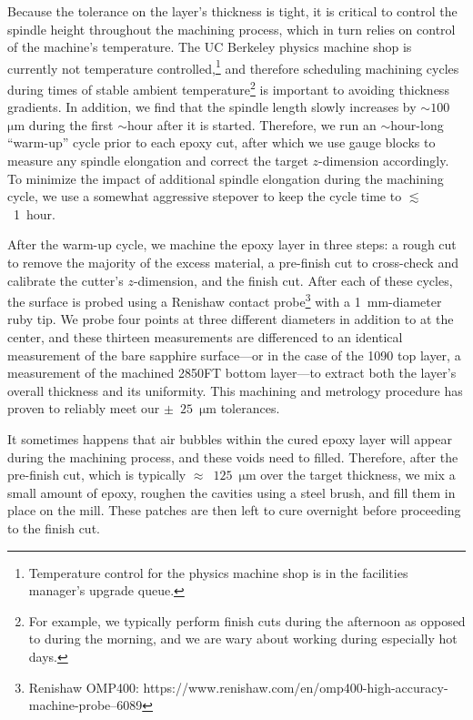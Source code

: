 Because the tolerance on the layer's thickness is tight, it is critical to control the spindle height throughout the machining process, which in turn relies on control of the machine's temperature. The UC Berkeley physics machine shop is currently not temperature controlled,\footnote{Temperature control for the physics machine shop is in the facilities manager's upgrade queue.} and therefore scheduling machining cycles during times of stable ambient temperature\footnote{For example, we typically perform finish cuts during the afternoon as opposed to during the morning, and we are wary about working during especially hot days.} is important to avoiding thickness gradients. In addition, we find that the spindle length slowly increases by $\sim 100$~$\mathrm{\mu m}$ during the first $\sim$hour after it is started. Therefore, we run an $\sim$hour-long ``warm-up'' cycle prior to each epoxy cut, after which we use gauge blocks to measure any spindle elongation and correct the target $z$-dimension accordingly. To minimize the impact of additional spindle elongation during the machining cycle, we use a somewhat aggressive stepover to keep the cycle time to $\lesssim$~1~hour.

After the warm-up cycle, we machine the epoxy layer in three steps: a rough cut to remove the majority of the excess material, a pre-finish cut to cross-check and calibrate the cutter's $z$-dimension, and the finish cut. After each of these cycles, the surface is probed using a Renishaw contact probe\footnote{Renishaw OMP400: https://www.renishaw.com/en/omp400-high-accuracy-machine-probe--6089} with a 1~mm-diameter ruby tip. We probe four points at three different diameters in addition to at the center, and these thirteen measurements are differenced to an identical measurement of the bare sapphire surface---or in the case of the 1090 top layer, a measurement of the machined 2850FT bottom layer---to extract both the layer's overall thickness and its uniformity. This machining and metrology procedure has proven to reliably meet our $\pm$~$25$~$\mathrm{\mu m}$ tolerances.

It sometimes happens that air bubbles within the cured epoxy layer will appear during the machining process, and these voids need to filled. Therefore, after the pre-finish cut, which is typically $\approx$~$125$~$\mathrm{\mu m}$ over the target thickness, we mix a small amount of epoxy, roughen the cavities using a steel brush, and fill them in place on the mill. These patches are then left to cure overnight before proceeding to the finish cut.

